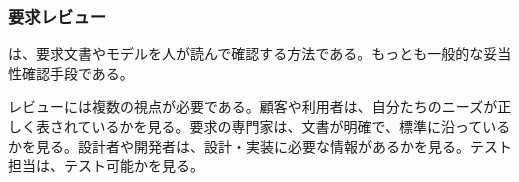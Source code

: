 \subsubsection{要求レビュー}

は、要求文書やモデルを人が読んで確認する方法である。もっとも一般的な妥当性確認手段である。

レビューには複数の視点が必要である。顧客や利用者は、自分たちのニーズが正しく表されているかを見る。要求の専門家は、文書が明確で、標準に沿っているかを見る。設計者や開発者は、設計・実装に必要な情報があるかを見る。テスト担当は、テスト可能かを見る。
